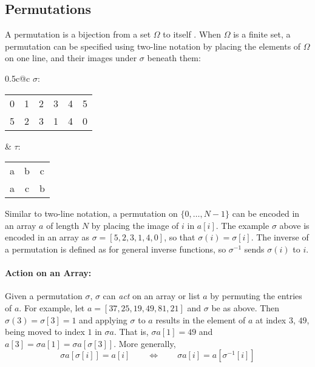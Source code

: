 \documentclass{llncs}
\begin{document}
    \vspace{-0.1in}
  \subsection{Permutations}
  \label{perms}

    A permutation is a bijection from a set \(\Omega\) to itself \cite{dummitfoote}.
    When \(\Omega\) is a finite set, a permutation can be specified using two-line
    notation by placing the elements of \(\Omega\) on one line, and their images
    under \(\sigma\) beneath them:

    \begin{center}
    \begin{tabular*}{0.5\textwidth}{c@{\extracolsep{\fill}}c}
    \(\sigma\):
    \begin{tabular}{c@{\hspace{1em}}c@{\hspace{1em}}c@{\hspace{1em}}c@{\hspace{1em}}c@{\hspace{1em}}c}
    0 & 1 & 2 & 3 & 4 & 5\\
    5 & 2 & 3 & 1 & 4 & 0
    \end{tabular}
    &
    \(\tau\):
    \begin{tabular}{c@{\hspace{1em}}c@{\hspace{1em}}c}
    a & b & c\\
    a & c & b
    \end{tabular}
    \end{tabular*}
    \end{center}

    Similar to two-line notation, a permutation on \(\{0, \dotsc, N-1\}\) can be
    encoded in an array \(a\) of length \(N\) by placing the image of \(i\) in
    \(a[i]\).  The example \(\sigma\) above is encoded in an array as \(\sigma = [5,
    2, 3, 1, 4, 0]\), so that \(\sigma(i) = \sigma[i]\).
    The inverse of a permutation is defined as for general inverse functions,
    so $\sigma^{-1}$ sends $\sigma(i)$ to $i$.

  \paragraph{Action on an Array:}

    Given a permutation \(\sigma\), \(\sigma\) can {\it act} on an array or list \(a\)
    by permuting the entries of $a$.
    For example, let \(a = [37, 25, 19, 49, 81, 21]\) and \(\sigma\) be as above.  
    Then \(\sigma(3) = \sigma[3] = 1\) and applying \(\sigma\) to \(a\) results in the
    element of \(a\) at index \(3\), \(49\), being moved to index \(1\) in \(\sigma
    a\).  That is, \(\sigma a[1] = 49\) and \(a[3] = \sigma a[1] = \sigma
    a[\sigma[3]]\).  More generally,
    \begin{equation}
    \sigma a[\sigma[i]] = a[i] \qquad 
      \Longleftrightarrow \qquad \sigma a[i] = a[\sigma^{-1}[i]]
    \label{action}
    \end{equation}
\end{document}
